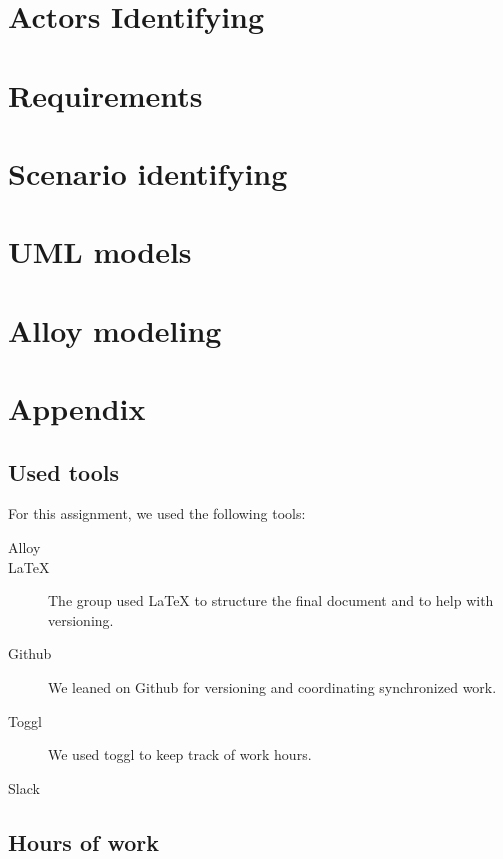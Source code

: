 \documentclass{article}
\begin{document}
	\newpage
	\section{Actors Identifying}

	\newpage
	\section{Requirements}

	\newpage
	\section{Scenario identifying}
	
		

	\newpage
	\section{UML models}

	\newpage
	\section{Alloy modeling}

	\newpage
	\section{Appendix}
		\listoffigures
		\listoftables
		
		\subsection{Used tools}
		For this assignment, we used the following tools:
		
		\begin{description}
			\item [Alloy]
			\item [LaTeX] The group used LaTeX to structure the final document and to help with versioning.
			\item [Github] We leaned on Github for versioning and coordinating synchronized work.
			\item [Toggl] We used toggl to keep track of work hours.
			\item [Slack]  
			
		\end{description}
		
		\subsection{Hours of work}
\end{document}
